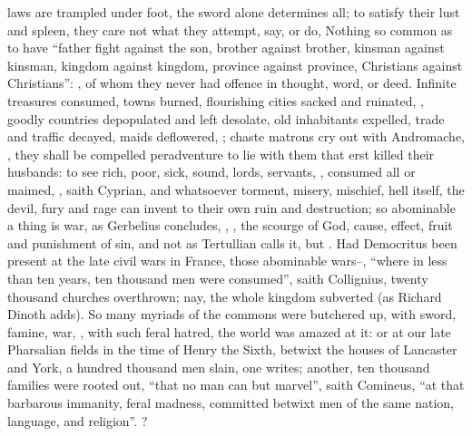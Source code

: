 laws are trampled under foot, the sword alone determines all; to satisfy their
lust and spleen, they care not what they attempt, say, or do,
Nothing so common as to have \enquote{father fight against the son,
brother against brother, kinsman against kinsman, kingdom against kingdom,
province against province, Christians against Christians}: , of whom they never had offence in thought,
word, or deed. Infinite treasures consumed, towns burned, flourishing cities
sacked and ruinated, , goodly countries
depopulated and left desolate, old inhabitants expelled, trade and traffic
decayed, maids deflowered, ; chaste matrons cry out with Andromache,
, they shall be compelled peradventure to lie with them that erst
killed their husbands: to see rich, poor, sick, sound, lords, servants,
, consumed all or maimed, \etc{} , saith Cyprian, and
whatsoever torment, misery, mischief, hell itself, the devil,
fury and rage can invent to their own ruin and destruction;
so abominable a thing is war, as Gerbelius concludes,
, \etc{}, the scourge of God, cause, effect, fruit and punishment
of sin, and not  as Tertullian calls it, but
. Had Democritus been present at the late civil wars in France, those
abominable wars--, \enquote{where
in less than ten years, ten thousand men were consumed}, saith Collignius,
twenty thousand churches overthrown; nay, the whole kingdom subverted (as
Richard Dinoth adds). So many myriads of the commons were
butchered up, with sword, famine, war, , with such feral hatred, the world was
amazed at it: or at our late Pharsalian fields in the time of Henry the Sixth,
betwixt the houses of Lancaster and York, a hundred thousand men slain,
one writes; another, ten thousand
families were rooted out, \enquote{that no man can but marvel}, saith Comineus, \enquote{at
that barbarous immanity, feral madness, committed betwixt men of the same
nation, language, and religion}. ?
